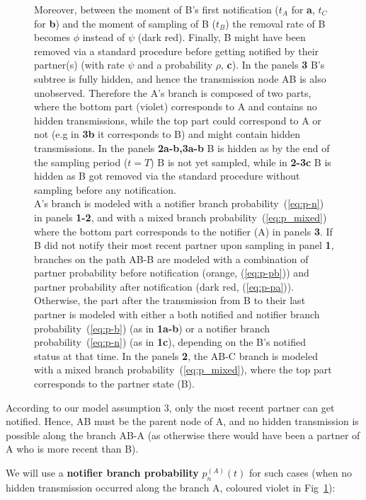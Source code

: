 \documentclass[10pt,letterpaper]{article}
\begin{document}
\begin{figure}[h!]
{Moreover, between the moment of B's first notification ($t_A$ for \textbf{a}, $t_C$ for \textbf{b}) and the moment of sampling  of B ($t_B$) the removal rate of B becomes $\phi$ instead of $\psi$ (dark red).
Finally, B might have been removed via a standard procedure before getting notified by their partner(s) (with rate $\psi$ and a probability $\rho$, \textbf{c}).
In the panels \textbf{3} B's subtree is fully hidden, and hence the transmission node AB is also unobserved. Therefore the A's branch is composed of two parts, where the bottom part (violet) corresponds to A and contains no hidden transmissions, while the top part could correspond to A or not  (e.g in \textbf{3b} it corresponds to B) and might contain hidden transmissions. 
In the panels \textbf{2a-b,3a-b} B is hidden as by the end of the sampling period ($t=T$) B is not yet sampled, while in \textbf{2-3c} B is hidden as B got removed via the standard procedure without sampling before any notification.
\\
A's branch is modeled with a notifier branch probability~(\ref{eq:p-n}) in panels \textbf{1-2}, and with a mixed branch probability~(\ref{eq:p_mixed}) where the bottom part corresponds to the notifier (A) in panels \textbf{3}. If B did not notify their most recent partner upon sampling in panel \textbf{1}, branches on the path AB-B are modeled with a combination of partner probability before notification (orange, (\ref{eq:p-pb})) and partner probability after notification (dark red, (\ref{eq:p-pa})). Otherwise, the part after the transmission from B to their last partner is modeled with either a both notified and notifier branch probability~(\ref{eq:p-b}) (as in \textbf{1a-b}) or a notifier branch probability~(\ref{eq:p-n}) (as in \textbf{1c}), depending on the B's notified status at that time. In the panels \textbf{2}, the AB-C branch is modeled with a mixed branch probability~(\ref{eq:p_mixed}), where the top part corresponds to the partner state (B).
}
\label{fig:pn-branches} 
\end{figure}


According to our model assumption 3, only the most recent partner can get notified. Hence, AB must be the parent node of A, and no hidden transmission is possible along the branch AB-A (as otherwise there would have been a partner of A who is more recent than B).

We will use a \textbf{notifier branch probability} $p_n^{(A)}(t)$ for such cases (when no hidden transmission occurred along the branch A, coloured violet in Fig~\ref{fig:pn-branches}):
\end{document}
